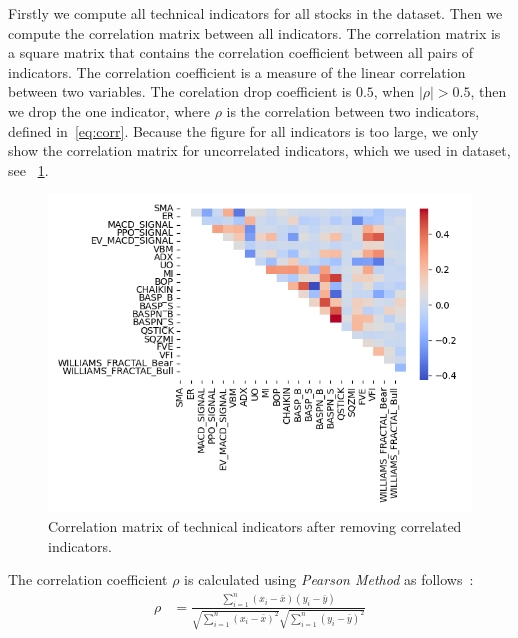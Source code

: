 \documentclass[../xlapes02]{subfiles}
\begin{document}
    Firstly we compute all technical indicators for all stocks in the dataset. Then we compute the correlation matrix between all indicators. The correlation matrix is a square matrix that contains the correlation coefficient between all pairs of indicators. The correlation coefficient is a measure of the linear correlation between two variables. The corelation drop coefficient is $0.5$, when $|\rho| > 0.5$, then we drop the one indicator, where $\rho$ is the correlation between two indicators, defined in~\cref{eq:corr}. Because the figure for all indicators is too large, we only show the correlation matrix for uncorrelated indicators, which we used in dataset, see ~\cref{fig:ta_correlation_matrix_uncorrelated_indicators}.
    \begin{figure}[h]
        \includegraphics[width=0.95\linewidth]{image/ta_correlation_matrix_uncorrelated_indicators}
        \centering
        \caption{Correlation matrix of technical indicators after removing correlated indicators.}
        \label{fig:ta_correlation_matrix_uncorrelated_indicators}
    \end{figure}

    The correlation coefficient $\rho$ is calculated using \emph{Pearson Method} as follows~\cite{enwiki:1146097966}:
    \begin{equation}
        \label{eq:corr}
        \begin{split}
            \rho&=\frac{\sum_{i=1}^{n}(x_i-\bar{x})(y_i-\bar{y})}{\sqrt{\sum_{i=1}^{n}(x_i-\bar{x})^2}\sqrt{\sum_{i=1}^{n}(y_i-\bar{y})^2}}\\
        \end{split}
    \end{equation}
\end{document}
